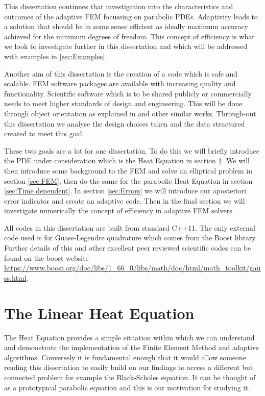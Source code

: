 \documentclass{uonmathreport}
\theoremstyle{definition}
\theoremstyle{problem}
\theoremstyle{theorem}
\begin{document}
This dissertation continues that investigation into the characteristics and outcomes of the adaptive FEM focussing on parabolic PDEs. Adaptivity leads to a solution that should be in some sense efficient as ideally maximum accuracy achieved for the minimum degrees of freedom. This concept of efficiency is what we look to investigate further in this dissertation and which will be addressed with examples in \ref{sec:Examples}.

Another aim of this dissertation is the creation of a code which is safe and scalable. FEM software packages are available with increasing quality and functionality. Scientific software which is to be shared publicly or commercially needs to meet higher standards of design and engineering. This will be done through object orientation as explained in \cite{pitt2012guide} and other similar works. Through-out this dissertation we analyse the design choices taken and the data structured created to meet this goal. 

These two goals are a lot for one dissertation. To do this we will briefly introduce the PDE under consideration which is the Heat Equation in section \ref{sec:Heat Equation}. We will then introduce some background to the FEM and solve an elliptical problem in section \ref{sec:FEM}, then do the same for the parabolic Heat Equation in section \ref{sec:Time dependent}. In section \ref{sec:Errors} we will introduce our aposteriori error indicator and create an adaptive code. Then in the final section \label{sec:Examples} we will investigate numerically the concept of efficiency in adaptive FEM solvers.

All codes in this dissertation are built from standard C++11. The only external code used is for Guass-Legendre quadrature which comes from the Boost library. Further details of this and other excellent peer reviewed scientific codes can be found on the boost website \url{https://www.boost.org/doc/libs/1_66_0/libs/math/doc/html/math_toolkit/gauss.html}.


\newpage

\section{The Linear Heat Equation} \label{sec:Heat Equation}

The Heat Equation provides a simple situation within which we can understand and demonstrate the implementation of the Finite Element Method and adaptive algorithms. Conversely it is fundamental enough that it would allow someone reading this dissertation to easily build on our findings to access a different but connected problem for example the Black-Scholes equation. It can be thought of as a prototypical parabolic equation and this is our motivation for studying it.
\end{document}
